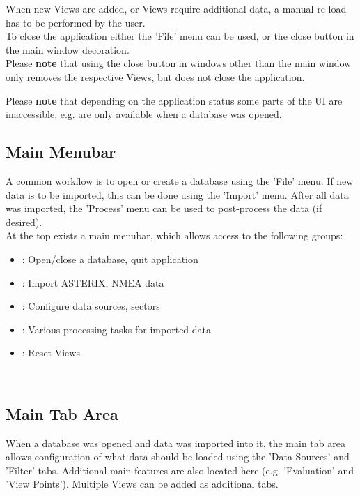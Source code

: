 When new Views are added, or Views require additional data, a manual re-load has to be performed by the user. \\

To close the application either the 'File' menu can be used, or the close button in the main window decoration. \\

Please \textbf{note} that using the close button in windows other than the main window only removes the respective Views, but does not close the application.

Please \textbf{note} that depending on the application status some parts of the UI are inaccessible, e.g. are only available when a database was opened.

\subsection{Main Menubar}

A common workflow is to open or create a database using the 'File' menu. If new data is to be imported, this can be done using the 'Import' menu. 
After all data was imported, the 'Process' menu can be used to post-process the data (if desired). \\

At the top exists a main menubar, which allows access to the following groups:

\begin{itemize}
 \item {}: Open/close a database, quit application
 \item {}: Import ASTERIX, NMEA data
 \item {}: Configure data sources, sectors
 \item {}: Various processing tasks for imported data
 \item {}: Reset Views
\end{itemize}
\  \\

\subsection{Main Tab Area}

When a database was opened and data was imported into it, the main tab area allows configuration of what data should be loaded using the 'Data Sources' and 'Filter' tabs. 
Additional main features are also located here (e.g. 'Evaluation' and 'View Points'). Multiple Views can be added as additional tabs. \\

